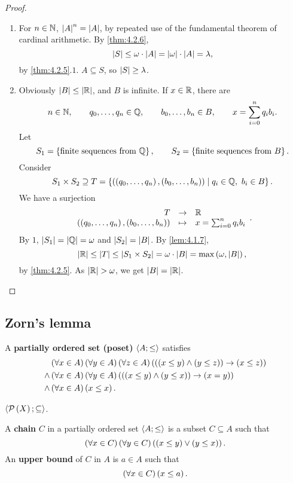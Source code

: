 \begin{proof}
\hfill
\begin{enumerate}
\item For $ n \in \mathbb{N} $, $ \left\lvert A \right\rvert^n = \left\lvert A \right\rvert $, by repeated use of the fundamental theorem of cardinal arithmetic. By \ref{thm:4.2.6},
$$ \left\lvert S \right\rvert \le \omega \cdot \left\lvert A \right\rvert = \left\lvert \omega \right\rvert \cdot \left\lvert A \right\rvert = \lambda, $$
by \ref{thm:4.2.5}.$ 1 $. $ A \subseteq S $, so $ \left\lvert S \right\rvert \ge \lambda $.
\item Obviously $ \left\lvert B \right\rvert \le \left\lvert \mathbb{R} \right\rvert $, and $ B $ is infinite. If $ x \in \mathbb{R} $, there are
$$ n \in \mathbb{N}, \qquad q_0, \dots, q_n \in \mathbb{Q}, \qquad b_0, \dots, b_n \in B, \qquad x = \sum_{i = 0}^n q_ib_i. $$
Let
$$ S_1 = \left\{ \text{finite sequences from} \ \mathbb{Q} \right\}, \qquad S_2 = \left\{ \text{finite sequences from} \ B \right\}. $$
Consider
$$ S_1 \times S_2 \supseteq T = \cb{\rb{\rb{q_0, \dots, q_n}, \rb{b_0, \dots, b_n}} \mid q_i \in \Q, \ b_i \in B}. $$
We have a surjection
$$ \function{T}{\R}{\rb{\rb{q_0, \dots, q_n}, \rb{b_0, \dots, b_n}}}{x = \sum_{i = 0}^n q_ib_i}. $$
By $ 1 $, $ \left\lvert S_1 \right\rvert = \left\lvert \mathbb{Q} \right\rvert = \omega $ and $ \left\lvert S_2 \right\rvert = \left\lvert B \right\rvert $. By \ref{lem:4.1.7},
$$ \left\lvert \mathbb{R} \right\rvert \le \left\lvert T \right\rvert \le \left\lvert S_1 \times S_2 \right\rvert = \omega \cdot \left\lvert B \right\rvert = \max\left( \omega, \left\lvert B \right\rvert \right), $$
by \ref{thm:4.2.5}. As $ \left\lvert \mathbb{R} \right\rvert > \omega $, we get $ \left\lvert B \right\rvert = \left\lvert \mathbb{R} \right\rvert $.
\end{enumerate}
\end{proof}

\pagebreak

\subsection{Zorn's lemma}


A \textbf{partially ordered set (poset)} $ \left\langle A; \le \right\rangle $ satisfies
\begin{align*}
& \left( \forall x \in A \right)\left( \forall y \in A \right)\left( \forall z \in A \right)\left( \left( \left( x \le y \right) \land \left( y \le z \right) \right) \rightarrow \left( x \le z \right) \right) \\
\land & \left( \forall x \in A \right)\left( \forall y \in A \right)\left( \left( \left( x \le y \right) \land \left( y \le x \right) \right) \rightarrow \left( x = y \right) \right) \\
\land & \left( \forall x \in A \right)\left( x \le x \right).
\end{align*}

\begin{example2}
$ \left\langle \mathcal{P}\left( X \right); \subseteq \right\rangle $.
\end{example2}

A \textbf{chain} $ C $ in a partially ordered set $ \left\langle A; \le \right\rangle $ is a subset $ C \subseteq A $ such that
$$ \left( \forall x \in C \right)\left( \forall y \in C \right)\left( \left( x \le y \right) \lor \left( y \le x \right) \right). $$
An \textbf{upper bound} of $ C $ in $ A $ is $ a \in A $ such that
$$ \left( \forall x \in C \right)\left( x \le a \right). $$


